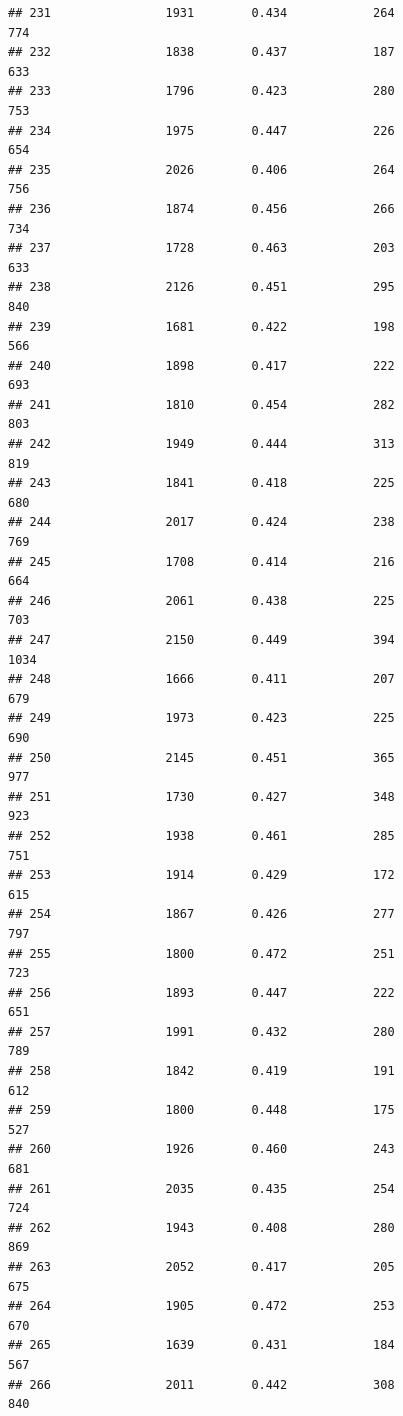 \documentclass[]{book}
\begin{document}
\begin{verbatim}
## 231                1931        0.434            264                774
## 232                1838        0.437            187                633
## 233                1796        0.423            280                753
## 234                1975        0.447            226                654
## 235                2026        0.406            264                756
## 236                1874        0.456            266                734
## 237                1728        0.463            203                633
## 238                2126        0.451            295                840
## 239                1681        0.422            198                566
## 240                1898        0.417            222                693
## 241                1810        0.454            282                803
## 242                1949        0.444            313                819
## 243                1841        0.418            225                680
## 244                2017        0.424            238                769
## 245                1708        0.414            216                664
## 246                2061        0.438            225                703
## 247                2150        0.449            394               1034
## 248                1666        0.411            207                679
## 249                1973        0.423            225                690
## 250                2145        0.451            365                977
## 251                1730        0.427            348                923
## 252                1938        0.461            285                751
## 253                1914        0.429            172                615
## 254                1867        0.426            277                797
## 255                1800        0.472            251                723
## 256                1893        0.447            222                651
## 257                1991        0.432            280                789
## 258                1842        0.419            191                612
## 259                1800        0.448            175                527
## 260                1926        0.460            243                681
## 261                2035        0.435            254                724
## 262                1943        0.408            280                869
## 263                2052        0.417            205                675
## 264                1905        0.472            253                670
## 265                1639        0.431            184                567
## 266                2011        0.442            308                840

\end{verbatim}
\end{document}
